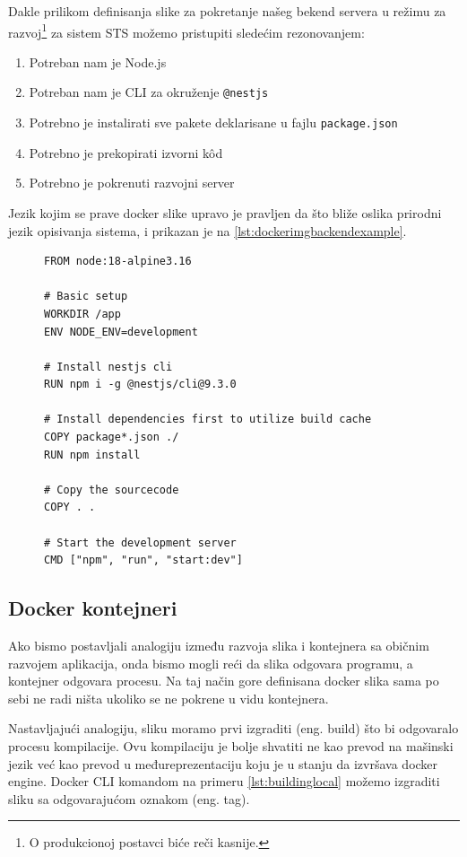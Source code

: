 \documentclass[12pt,oneside]{memoir}
\begin{document}
Dakle prilikom definisanja slike za pokretanje našeg bekend servera u režimu za razvoj\footnote{O produkcionoj postavci biće reči kasnije.} za sistem STS možemo pristupiti sledećim rezonovanjem:

\begin{enumerate}
    \item Potreban nam je Node.js
    \item Potreban nam je CLI za okruženje \verb|@nestjs|
    \item Potrebno je instalirati sve pakete deklarisane u fajlu \verb|package.json|
    \item Potrebno je prekopirati izvorni k\^{o}d
    \item Potrebno je pokrenuti razvojni server
\end{enumerate}

Jezik kojim se prave docker slike upravo je pravljen da što bliže oslika prirodni jezik opisivanja sistema, i prikazan je na \ref{lst:dockerimgbackendexample}.

\begin{figure}[h]
\begin{lstlisting}[language=docker, caption={Slika za bekend server}, label={lst:dockerimgbackendexample}]
FROM node:18-alpine3.16

# Basic setup
WORKDIR /app
ENV NODE_ENV=development

# Install nestjs cli
RUN npm i -g @nestjs/cli@9.3.0

# Install dependencies first to utilize build cache
COPY package*.json ./
RUN npm install

# Copy the sourcecode
COPY . .

# Start the development server
CMD ["npm", "run", "start:dev"]
\end{lstlisting}
\end{figure}

\subsection{Docker kontejneri}

Ako bismo postavljali analogiju između razvoja slika i kontejnera sa običnim razvojem aplikacija, onda bismo mogli reći da slika odgovara programu, a kontejner odgovara procesu. Na taj način gore definisana docker slika sama po sebi ne radi ništa ukoliko se ne pokrene u vidu kontejnera. 

Nastavljajući analogiju, sliku moramo prvi izgraditi (eng. build) što bi odgovaralo procesu kompilacije. Ovu kompilaciju je bolje shvatiti ne kao prevod na mašinski jezik već kao prevod u međureprezentaciju koju je u stanju da izvršava docker engine. Docker CLI komandom na primeru \ref{lst:buildinglocal} možemo izgraditi sliku sa odgovarajućom oznakom (eng. tag).
\end{document}
